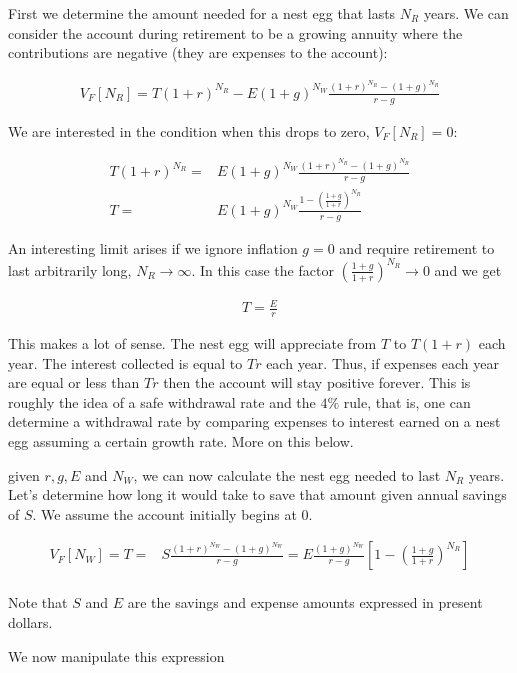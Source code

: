 \documentclass[12pt]{article}
\begin{document}
First we determine the amount needed for a nest egg that lasts $N_R$ years.
We can consider the account during retirement to be a growing annuity where the contributions are negative (they are expenses to the account):

\begin{align}
V_F[N_R] = T(1+r)^{N_R} - E(1+g)^{N_W} \frac{(1+r)^{N_R} - (1+g)^{N_R}}{r-g}
\end{align}

We are interested in the condition when this drops to zero, $V_F[N_R] = 0$:

\begin{align}
T(1+r)^{N_R} =& E(1+g)^{N_W} \frac{(1+r)^{N_R} - (1+g)^{N_R}}{r-g}\\
T =& E(1+g)^{N_W} \frac{1 - \left(\frac{1+g}{1+r}\right)^{N_R}}{r-g}
\end{align}

An interesting limit arises if we ignore inflation $g=0$ and require retirement to last arbitrarily long, $N_R \rightarrow \infty$.
In this case the factor $\left(\frac{1+g}{1+r}\right)^{N_R} \rightarrow 0$ and we get

\begin{align}
T = \frac{E}{r}
\end{align}

This makes a lot of sense. 
The nest egg will appreciate from $T$ to $T(1+r)$ each year.
The interest collected is equal to $Tr$ each year.
Thus, if expenses each year are equal or less than $Tr$ then the account will stay positive forever.
This is roughly the idea of a safe withdrawal rate and the $4\%$ rule, that is, one can determine a withdrawal rate by comparing expenses to interest earned on a nest egg assuming a certain growth rate. More on this below.

given $r, g, E$ and $N_W$, we can now calculate the nest egg needed to last $N_R$ years.
Let's determine how long it would take to save that amount given annual savings of $S$.
We assume the account initially begins at 0.

\begin{align}
V_F[N_W] = T =& S\frac{(1+r)^{N_W} - (1+g)^{N_W}}{r-g} = E \frac{(1+g)^{N_W}}{r-g}\left[1-\left(\frac{1+g}{1+r}\right)^{N_R}\right]\\
\end{align}

Note that $S$ and $E$ are the savings and expense amounts expressed in present dollars.

We now manipulate this expression
\end{document}

